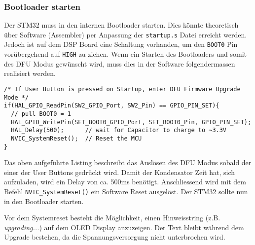 \subsubsection{Bootloader starten}
\label{sec:Enter_DFU}

Der STM32 muss in den internen Bootloader starten. Dies könnte theoretisch über Software (Assembler) per Anpassung der \texttt{startup.s} Datei erreicht werden.
Jedoch ist auf dem DSP Board eine Schaltung vorhanden, um den \texttt{BOOT0} Pin vorübergehend auf \texttt{HIGH} zu ziehen.
Wenn ein Starten des Bootloaders und somit des DFU Modus gewünscht wird, muss dies in der Software folgendermassen realisiert werden.
\\
\begin{lstlisting}[style=Cuvision,caption={Starten des Bootloaders durch CPU Reset}]
/* If User Button is pressed on Startup, enter DFU Firmware Upgrade Mode */
if(HAL_GPIO_ReadPin(SW2_GPIO_Port, SW2_Pin) == GPIO_PIN_SET){
  // pull BOOT0 = 1
  HAL_GPIO_WritePin(SET_BOOT0_GPIO_Port, SET_BOOT0_Pin, GPIO_PIN_SET);
  HAL_Delay(500);      // wait for Capacitor to charge to ~3.3V
  NVIC_SystemReset();  // Reset the MCU
}
\end{lstlisting}

Das oben aufgeführte Listing beschreibt das Auslösen des DFU Modus sobald der einer der User Buttons gedrückt wird.
Damit der Kondensator Zeit hat, sich aufzuladen, wird ein Delay von ca. 500ms benötigt.
Anschliessend wird mit dem Befehl \texttt{NVIC\_SystemReset()} ein Software Reset ausgelöst.
Der STM32 sollte nun in den Bootloader starten.

Vor dem Systemreset besteht die Möglichkeit, einen Hinweisstring (z.B. \textit{\glqq upgrading...\grqq}) auf dem OLED Display anzuzeigen.
Der Text bleibt während dem Upgrade bestehen, da die Spannungsversorgung nicht unterbrochen wird.



